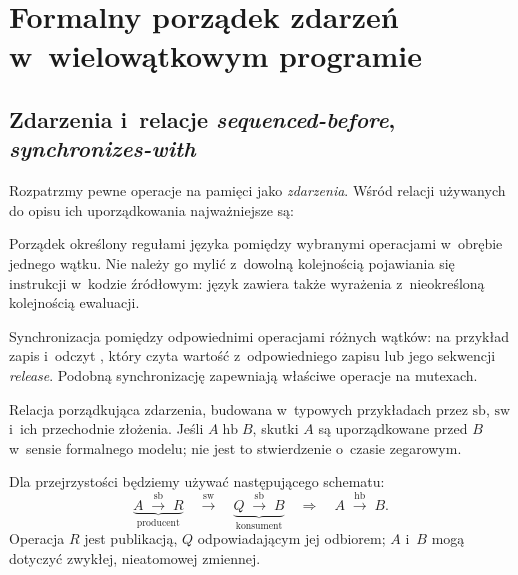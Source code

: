 
\section{Formalny porządek zdarzeń w~wielowątkowym programie}
\label{sec:cpp16-formal}

\subsection{Zdarzenia i~relacje \emph{sequenced-before}, \emph{synchronizes-with}}

Rozpatrzmy pewne operacje na pamięci jako \emph{zdarzenia}. Wśród relacji
używanych do opisu ich uporządkowania najważniejsze są:
\begin{description}[style=nextline]
\item[\emph{Sequenced-before} (\(\mathrm{sb}\))]
  Porządek określony regułami języka pomiędzy wybranymi operacjami
  w~obrębie jednego wątku. Nie należy go mylić z~dowolną kolejnością
  pojawiania się instrukcji w~kodzie źródłowym: język zawiera także
  wyrażenia z~nieokreśloną kolejnością ewaluacji.
\item[\emph{Synchronizes-with} (\(\mathrm{sw}\))]
  Synchronizacja pomiędzy odpowiednimi operacjami różnych wątków:
  na przykład zapis  i~odczyt , który czyta
  wartość z~odpowiedniego zapisu lub jego sekwencji \emph{release}.
  Podobną synchronizację zapewniają właściwe operacje na mutexach.
\item[\emph{Happens-before} (\(\mathrm{hb}\))]
  Relacja porządkująca zdarzenia, budowana w~typowych przykładach
  przez \(\mathrm{sb}\), \(\mathrm{sw}\) i~ich przechodnie złożenia.
  Jeśli \(A\;\mathrm{hb}\;B\), skutki \(A\) są uporządkowane przed \(B\)
  w~sensie formalnego modelu; nie jest to stwierdzenie o~czasie zegarowym.
\end{description}

Dla przejrzystości będziemy używać następującego schematu:
\[
\underbrace{A\;\xrightarrow{\mathrm{sb}}\;R}_{\text{producent}}
\quad\xrightarrow{\mathrm{sw}}\quad
\underbrace{Q\;\xrightarrow{\mathrm{sb}}\;B}_{\text{konsument}}
\quad\Longrightarrow\quad A\;\xrightarrow{\mathrm{hb}}\;B.
\]
Operacja \(R\) jest publikacją, \(Q\) odpowiadającym jej odbiorem;
\(A\) i~\(B\) mogą dotyczyć zwykłej, nieatomowej zmiennej.

